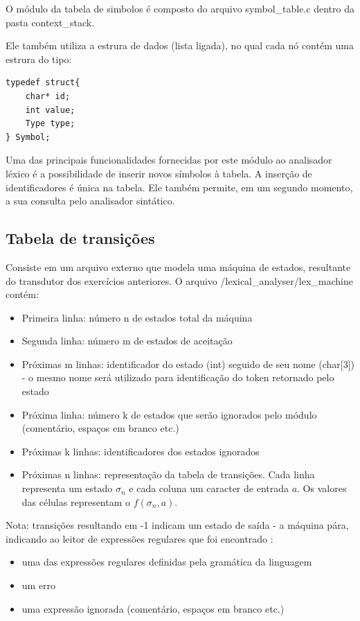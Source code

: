 O módulo da tabela de simbolos é composto do arquivo symbol\_table.c dentro da pasta context\_stack.

Ele também utiliza a estrura de dados (lista ligada), no qual cada nó contém uma estrura do tipo:

\lstset{language=C}
\begin{lstlisting}[frame=single]
typedef struct{
    char* id;
    int value;
    Type type;
} Symbol;
\end{lstlisting}

Uma das principais funcionalidades fornecidas por este módulo ao analisador léxico é a possibilidade de inserir novos símbolos à tabela. A inserção de identificadores é única na tabela.
Ele também permite, em um segundo momento, a sua consulta pelo analisador sintático.

\subsection{Tabela de transições}

Consiste em um arquivo externo que modela uma máquina de estados, resultante do transdutor dos exercícios anteriores. 
O arquivo /lexical\_analyser/lex\_machine contém:

\begin{itemize}
	\item Primeira linha: número n de estados total da máquina
	\item Segunda linha: número m de estados de aceitação
	\item Próximas m linhas: identificador do estado (int) seguido de seu nome (char[3]) - o mesmo nome será utilizado para identificação do token retornado pelo estado
	\item Próxima linha: número k de estados que serão ignorados pelo módulo (comentário, espaços em branco etc.)
	\item Próximas k linhas: identificadores dos estados ignorados
	\item Próximas n linhas: representação da tabela de transições. Cada linha representa um estado $\sigma_n$ e cada coluna um caracter de entrada $a$. Os valores das células representam o $f(\sigma_n, a)$.
\end{itemize}

Nota: transições resultando em -1 indicam um estado de saída - a máquina pára, indicando ao leitor de expressões regulares que foi encontrado :

\begin{itemize}
	\item uma das expressões regulares definidas pela gramática da linguagem 
	\item um erro
	\item uma expressão ignorada (comentário, espaços em branco etc.)
\end{itemize}

